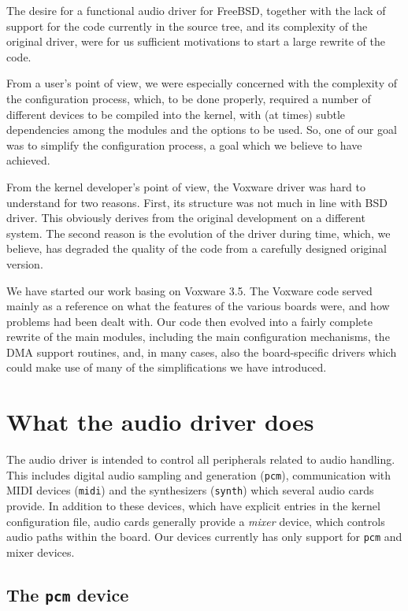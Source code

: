 \documentclass[11pt]{article}
\begin{document}
The desire for a functional audio driver for FreeBSD, together with
the lack of support for the code currently in the source tree, and
its complexity of the original driver, were for us sufficient
motivations to start a large rewrite of the code.

From a user's point of view, we were especially concerned with the
complexity of the configuration process, which, to be done properly,
required a number of different devices to be compiled into the kernel,
with (at times) subtle dependencies among the modules and the options
to be used. So, one of our goal was to simplify the configuration
process, a goal which we believe to have achieved.

From the kernel developer's point of view, the Voxware driver was hard
to understand for two reasons. First, its structure was not much in
line with BSD driver. This obviously derives from the original
development on a different system. The second reason is the evolution
of the driver during time, which, we believe, has degraded the quality of
the code from a carefully designed original version.

We have started our work basing on Voxware 3.5. The Voxware code
served mainly as a reference on what the features of the various
boards were, and how problems had been dealt with. Our code 
then evolved into a fairly complete rewrite of the main modules,
including the main configuration mechanisms, the DMA support
routines, and, in many cases, also the board-specific drivers which
could make use of many of the simplifications we have introduced.

\section{What the audio driver does}

The audio driver is intended to control all peripherals related to
audio handling. This includes digital audio sampling and generation
({\tt pcm}), communication with MIDI devices ({\tt midi}) and the
synthesizers ({\tt synth}) which several audio cards provide. In
addition to these devices, which have explicit entries in the kernel
configuration file, audio cards generally provide a {\em mixer}
device, which controls audio paths within the board.
Our devices currently has only support for {\tt pcm} and mixer
devices.

\subsection{The {\tt pcm} device}
\end{document}
